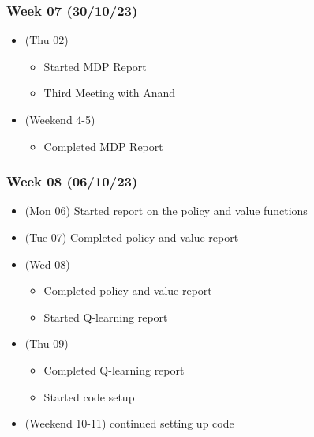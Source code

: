 \hypertarget{week-07-301023}{%
  \subsubsection{Week 07 (30/10/23)}\label{week-07-301023}}

\begin{itemize}
  \tightlist
  \item
        (Thu 02)

        \begin{itemize}
          \tightlist
          \item
                Started MDP Report
          \item
                Third Meeting with Anand
        \end{itemize}
  \item
        (Weekend 4-5)

        \begin{itemize}
          \tightlist
          \item
                Completed MDP Report
        \end{itemize}
\end{itemize}

\hypertarget{week-08-061023}{%
  \subsubsection{Week 08 (06/10/23)}\label{week-08-061023}}

\begin{itemize}
  \tightlist
  \item
        (Mon 06) Started report on the policy and value functions
  \item
        (Tue 07) Completed policy and value report
  \item
        (Wed 08)

        \begin{itemize}
          \tightlist
          \item
                Completed policy and value report
          \item
                Started Q-learning report
        \end{itemize}
  \item
        (Thu 09)

        \begin{itemize}
          \tightlist
          \item
                Completed Q-learning report
          \item
                Started code setup
        \end{itemize}
  \item
        (Weekend 10-11) continued setting up code
\end{itemize}


